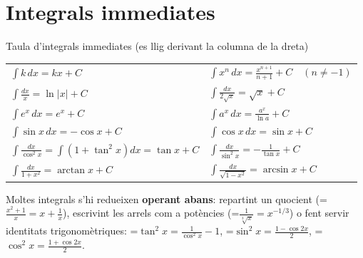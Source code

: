 \documentclass[11pt,a4paper]{article}
\newcommand{\fmm}[1]{\setbox0=\hbox{$#1$}\ifdim\wd0>\linewidth\fmdisp{#1}\else\mbox{\box0}\fi}
\newcommand{\fmdisp}[1]{\[\setbox2=\hbox{$\displaystyle #1$}\ifdim\wd2>\linewidth\resizebox{\linewidth}{!}{\box2}\else\box2\fi\]}
\begin{document}
\section{Integrals immediates}\hypertarget{sec2}{}

\begin{fmdef}{Taula d'integrals immediates (es llig derivant la columna de la dreta)}
\begin{center}\renewcommand{\arraystretch}{1.5}\small\begin{tabularx}{\linewidth}{>{\raggedright\arraybackslash}p{7.2cm}>{\raggedright\arraybackslash}X}\toprule
$\displaystyle\int k\,dx=kx+C$ & $\displaystyle\int x^n\,dx=\frac{x^{n+1}}{n+1}+C\quad(n\neq-1)$\\[3pt]
$\displaystyle\int\frac{dx}{x}=\ln|x|+C$ & $\displaystyle\int\frac{dx}{2\sqrt x}=\sqrt x+C$\\[3pt]
$\displaystyle\int e^x\,dx=e^x+C$ & $\displaystyle\int a^x\,dx=\frac{a^x}{\ln a}+C$\\[3pt]
$\displaystyle\int\sin x\,dx=-\cos x+C$ & $\displaystyle\int\cos x\,dx=\sin x+C$\\[5pt]
$\displaystyle\int\frac{dx}{\cos^2x}=\int\left(1+\tan^2x\right)dx=\tan x+C$ & $\displaystyle\int\frac{dx}{\sin^2x}=-\frac{1}{\tan x}+C$\\[5pt]
$\displaystyle\int\frac{dx}{1+x^2}=\arctan x+C$ & $\displaystyle\int\frac{dx}{\sqrt{1-x^2}}=\arcsin x+C$\\[5pt]
\bottomrule\end{tabularx}\end{center}

Moltes integrals s'hi redueixen \textbf{operant abans}: repartint un quocient (\fmm{\frac{x^2+1}{x}=x+\frac1x}), escrivint les arrels com a potències (\fmm{\frac{1}{\sqrt[3]x}=x^{-1/3}}) o fent servir identitats trigonomètriques: \fmm{\tan^2x=\frac{1}{\cos^2x}-1}, \fmm{\sin^2x=\frac{1-\cos2x}{2}}, \fmm{\cos^2x=\frac{1+\cos2x}{2}}.
\end{fmdef}
\end{document}
